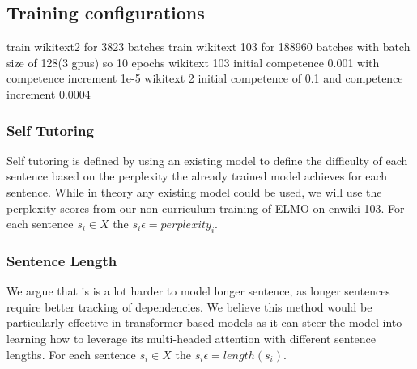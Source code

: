 \subsection{Training configurations}
train wikitext2 for 3823 batches
train wikitext 103 for 188960 batches
with batch size of 128(3 gpus) so 10 epochs
wikitext 103 initial competence 0.001 with competence increment 1e-5
wikitext 2 initial competence of 0.1 and competence increment 0.0004
\subsubsection{Self Tutoring}
Self tutoring is defined by using an existing model to define the difficulty of each sentence based on the perplexity the already trained model achieves for each sentence. While in theory any existing model could be used, we will use the perplexity scores from our non curriculum training of ELMO on enwiki-103. For each sentence $s_i \in X$ the  $s_i\epsilon = perplexity_i$.
\subsubsection{Sentence Length}
We argue that is is a lot harder to model longer sentence, as longer sentences require better tracking of dependencies. We believe this method would be particularly effective in transformer based models as it can steer the model into learning how to leverage its multi-headed attention with different sentence lengths. For each sentence $s_i \in X$ the  $s_i\epsilon = length(s_i)$.
